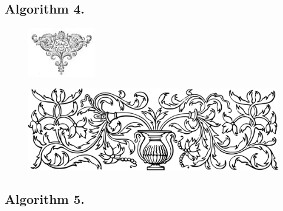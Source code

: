 \documentclass[preview]{standalone}
\begin{document}
\subsection[Count negative valued list entries.]{
    \color{section} Algorithm 4.
}

\vspace{1\baselineskip}
\begin{center}
    
\end{center}
\vspace{1\baselineskip}
\begin{center}
    
\end{center}
\begin{figure}[!h]
    \centering
    \includegraphics[width=3cm]{../resources/jpg/3.1.algorithms/symbol6.jpg}
\end{figure}
\pagebreak


\begin{figure}[!h]
    \centering
    \includegraphics[width=14cm]{../resources/jpg/3.1.algorithms/border1.png}
\end{figure}
\subsection[Find the last even list entry.]{
    \color{section} Algorithm 5.
}

\vspace{1\baselineskip}
\begin{center}
    
\end{center}
\vspace{1\baselineskip}
\begin{center}
    
\end{center}
\pagebreak
\end{document}
